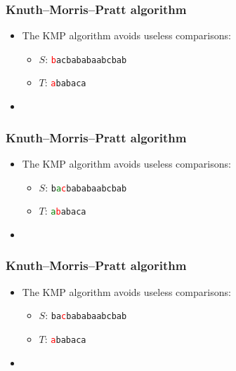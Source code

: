 \documentclass{beamer}
\begin{document}
\begin{frame}[plain]
    \frametitle{Knuth--Morris--Pratt algorithm}
    \begin{itemize}
    \item The KMP algorithm avoids useless comparisons:
        \begin{itemize}
            \item $S$: \texttt{\textcolor{red}{b}acbababaabcbab}
            \item $T$: \phantom{\texttt{}}\texttt{\textcolor{red}{a}babaca}
        \end{itemize}
    \item[] \phantom{The number of shifts depend on which characters are currently matched}
    \end{itemize}
\end{frame}
\begin{frame}[plain]
    \frametitle{Knuth--Morris--Pratt algorithm}
    \begin{itemize}
    \item The KMP algorithm avoids useless comparisons:
        \begin{itemize}
            \item $S$: \texttt{b\textcolor{green}{a}\textcolor{red}{c}bababaabcbab}
            \item $T$: \texttt{\textcolor{green}{a}\textcolor{red}{b}abaca}
        \end{itemize}
    \item[] \phantom{The number of shifts depend on which characters are currently matched}
    \end{itemize}
\end{frame}
\begin{frame}[plain]
    \frametitle{Knuth--Morris--Pratt algorithm}
    \begin{itemize}
    \item The KMP algorithm avoids useless comparisons:
        \begin{itemize}
            \item $S$: \texttt{ba\textcolor{red}{c}bababaabcbab}
            \item $T$: \texttt{\textcolor{red}{a}babaca}
        \end{itemize}
    \item[] \phantom{The number of shifts depend on which characters are currently matched}
    \end{itemize}
\end{frame}
\end{document}

